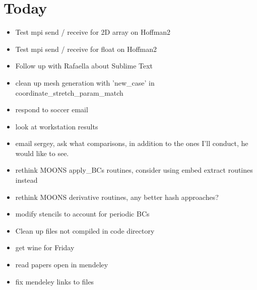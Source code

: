 \documentclass[11pt]{article}
\begin{document}
\section{Today}
\begin{itemize}
\setlength\itemsep{-1em}
\item Test mpi send / receive for 2D array on Hoffman2 \Checkmark
\item Test mpi send / receive for float on Hoffman2 \Checkmark
\item Follow up with Rafaella about Sublime Text \Checkmark
\item clean up mesh generation with 'new\_case' in coordinate\_stretch\_param\_match \Checkmark
\item respond to soccer email \Checkmark
% 
\item look at workstation results
\item email sergey, ask what comparisons, in addition to the ones I'll conduct, he would like to see.
% 
\item rethink MOONS apply\_BCs routines, consider using embed extract routines instead
\item rethink MOONS derivative routines, any better hash approaches?
\item modify stencils to account for periodic BCs
\item Clean up files not compiled in code directory
\item get wine for Friday
\item read papers open in mendeley
\item fix mendeley links to files
\end{itemize}
\end{document}
